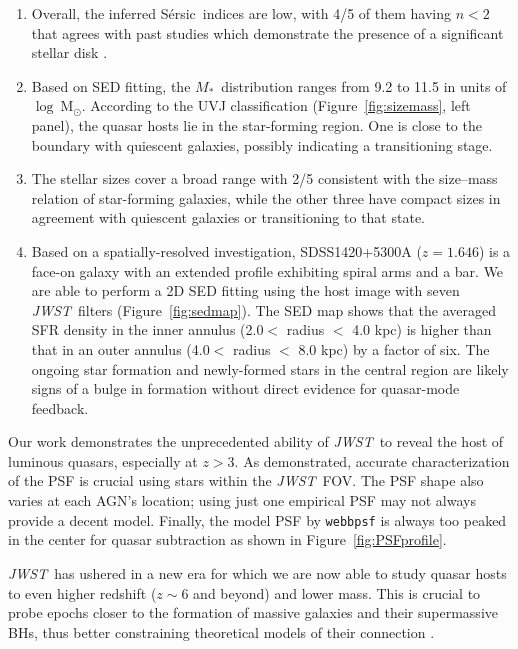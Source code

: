 \documentclass[twocolumn]{aastex631}
\newcommand{\sersic}{S\'ersic}
\newcommand{\smass}{{$M_*$}}
\newcommand{\jwst}{{\it JWST}}
\begin{document}
\begin{enumerate}

\item Overall, the inferred \sersic\ indices are low, with 4/5 of them having $n<2$ that agrees with past studies which demonstrate the presence of a significant stellar disk \citep[e.g.,][]{Li2021, Zhuang2022}. 

\item Based on SED fitting, the \smass\ distribution ranges from 9.2 to 11.5 in units of $\log~$M$_{\odot}$. According to the UVJ classification (Figure~\ref{fig:sizemass}, left panel), the quasar hosts lie in the star-forming region. One is close to the boundary with quiescent galaxies, possibly indicating a transitioning stage.

\item The stellar sizes cover a broad range with 2/5 consistent with the size--mass relation of star-forming galaxies, while the other three have compact sizes in agreement with quiescent galaxies or transitioning to that state. 

\item Based on a spatially-resolved investigation, SDSS1420+5300A ($z=1.646$) is a face-on galaxy with an extended profile exhibiting spiral arms and a bar. We are able to perform a 2D SED fitting using the host image with seven \jwst\ filters (Figure~\ref{fig:sedmap}). The SED map shows that the averaged SFR density in the inner annulus (2.0$<$ radius $<$ 4.0 kpc) is higher than that in an outer annulus (4.0$<$ radius $<$ 8.0 kpc) by a factor of six. The ongoing star formation and newly-formed stars in the central region are likely signs of a bulge in formation without direct evidence for quasar-mode feedback. 
\end{enumerate}

Our work demonstrates the unprecedented ability of \jwst\ to reveal the host of luminous quasars, especially at $z>3$. As demonstrated, accurate characterization of the PSF is crucial using stars within the \jwst\ FOV. The PSF shape also varies at each AGN's location; using just one empirical PSF may not always provide a decent model. Finally, the model PSF by \texttt{webbpsf} is always too peaked in the center for quasar subtraction as shown in Figure~\ref{fig:PSFprofile}.


\jwst\ has ushered in a new era for which we are now able to study quasar hosts to even higher redshift ($z\sim6$ and beyond) and lower mass. This is crucial to probe epochs closer to the formation of massive galaxies and their supermassive BHs, thus better constraining theoretical models of their connection \citep{Volonteri2021, Ding2022}.
\end{document}
